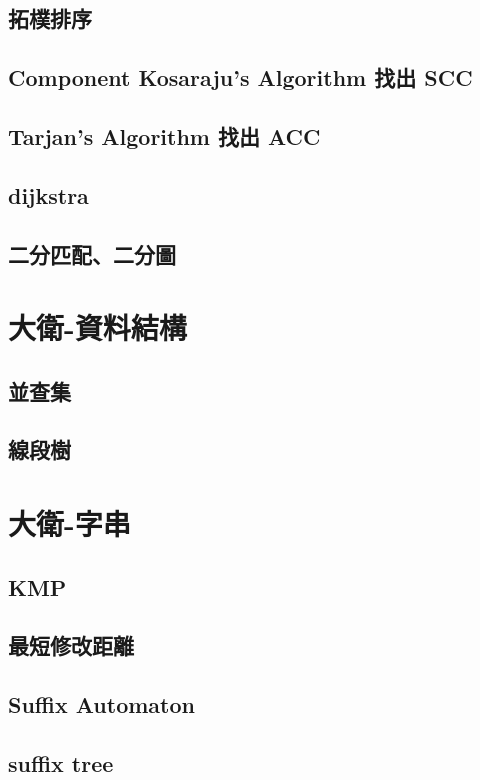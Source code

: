 \subsection{拓樸排序}
\raggedbottom
\hrulefill
\subsection{Component Kosaraju's Algorithm 找出 SCC}
\raggedbottom
\hrulefill
\subsection{Tarjan's Algorithm 找出 ACC}
\raggedbottom
\hrulefill
\subsection{dijkstra}
\raggedbottom
\hrulefill
\subsection{二分匹配、二分圖}
\raggedbottom
\hrulefill

\section{大衛-資料結構}
\subsection{並查集}
\raggedbottom
\hrulefill
\subsection{線段樹}
\raggedbottom
\hrulefill

\section{大衛-字串}
\subsection{KMP}
\raggedbottom
\hrulefill
\subsection{最短修改距離}
\raggedbottom
\hrulefill
\subsection{Suffix Automaton}
\raggedbottom
\hrulefill
\subsection{suffix tree}
\raggedbottom
\hrulefill

